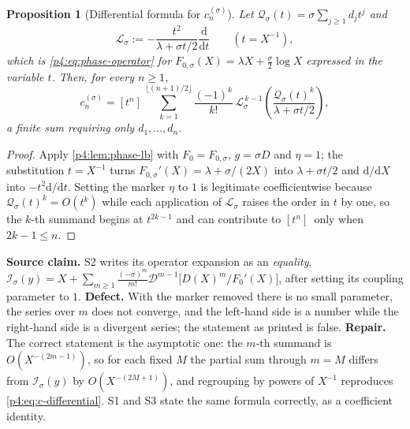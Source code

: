 \documentclass[11pt,a4paper,oneside]{book}
\theoremstyle{plain}
\newtheorem{proposition}[theorem]{Proposition}
\theoremstyle{definition}
\theoremstyle{remark}
\newcommand{\dd}{\mathrm{d}}
\newcommand{\Coef}[1]{[#1]\,}
\newcommand{\Xcore}{X}
\begin{document}
\begin{proposition}[Differential formula for $c_n^{(\sigma)}$]
\label{p4:prop:c-differential}
Let $\mathcal Q_\sigma(t)=\sigma\sum_{j\ge1}d_jt^{j}$ and
\begin{equation}
  \mathscr L_\sigma:=-\frac{t^{2}}{\lambda+\sigma t/2}\frac{\dd}{\dd t}
  \qquad(t=\Xcore^{-1}),
  \label{p4:eq:L-operator}
\end{equation}
which is \cref{p4:eq:phase-operator} for
$F_{0,\sigma}(\Xcore)=\lambda \Xcore+\tfrac\sigma2\log \Xcore$ expressed in
the variable $t$.  Then, for every $n\ge1$,
\begin{equation}
  \boxed{\;
  c_n^{(\sigma)}=\Coef{t^{n}}
   \sum_{k=1}^{\lfloor(n+1)/2\rfloor}\frac{(-1)^{k}}{k!}\,
   \mathscr L_\sigma^{\,k-1}
   \left(\frac{\mathcal Q_\sigma(t)^{k}}{\lambda+\sigma t/2}\right),\;}
  \label{p4:eq:c-differential}
\end{equation}
a \emph{finite} sum requiring only $d_1,\ldots,d_{n}$.
\end{proposition}

\begin{proof}
Apply \cref{p4:lem:phase-lb} with $F_0=F_{0,\sigma}$, $g=\sigma D$ and
$\eta=1$; the substitution $t=\Xcore^{-1}$ turns
$F_{0,\sigma}'(\Xcore)=\lambda+\sigma/(2\Xcore)$ into
$\lambda+\sigma t/2$ and $\dd/\dd \Xcore$ into $-t^{2}\dd/\dd t$.  Setting
the marker $\eta$ to $1$ is legitimate coefficientwise because
$\mathcal Q_\sigma(t)^{k}=O(t^{k})$ while each application of
$\mathscr L_\sigma$ raises the order in $t$ by one, so the $k$-th summand
begins at $t^{2k-1}$ and can contribute to $\Coef{t^{n}}$ only when
$2k-1\le n$.
\end{proof}

\begin{repairbox}
\textbf{Source claim.}  \textsf{S2} writes its operator expansion as an
\emph{equality},
$\mathcal I_\sigma(y)=\Xcore+\sum_{m\ge1}\frac{(-\sigma)^{m}}{m!}
\mathscr D^{m-1}\bigl[D(\Xcore)^{m}/F_0'(\Xcore)\bigr]$, after setting its
coupling parameter to $1$.  \textbf{Defect.}  With the marker removed there is
no small parameter, the series over $m$ does not converge, and the left-hand
side is a number while the right-hand side is a divergent series; the
statement as printed is false.  \textbf{Repair.}  The correct statement is the
asymptotic one: the $m$-th summand is $O(\Xcore^{-(2m-1)})$, so for each fixed
$M$ the partial sum through $m=M$ differs from $\mathcal I_\sigma(y)$ by
$O(\Xcore^{-(2M+1)})$, and regrouping by powers of $\Xcore^{-1}$ reproduces
\cref{p4:eq:c-differential}.  \textsf{S1} and \textsf{S3} state the same
formula correctly, as a coefficient identity.
\end{repairbox}
\end{document}
